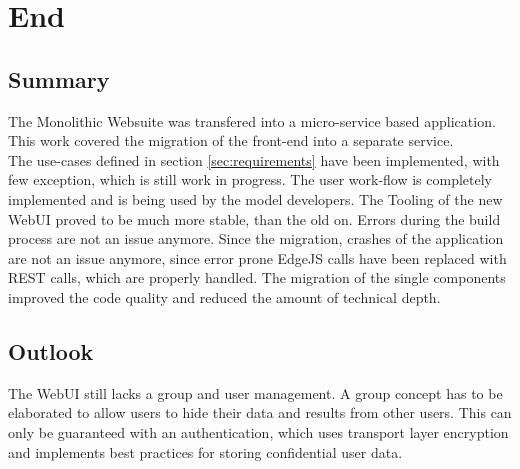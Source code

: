 
\chapter{End}



\section{Summary}
The Monolithic Websuite was transfered into a micro-service based application. This work covered the migration of the front-end into a separate service.\\
The use-cases defined in section \ref{sec:requirements} have been implemented, with few exception,  which is still work in progress. The user work-flow is completely implemented and is being used by the model developers. The Tooling of the new WebUI proved to be much more stable, than the old on. Errors during the build process are not an issue anymore. Since the migration, crashes of the application are not an issue anymore, since error prone EdgeJS calls have been replaced with REST calls, which are properly handled. The migration of the single components improved the code quality and reduced the amount of technical depth.



\section{Outlook}
The WebUI still lacks a group and user management. A group concept has to be elaborated to allow users to hide their data and results from other users. This can only be guaranteed with an authentication, which uses transport layer encryption and implements best practices for storing confidential user data.
